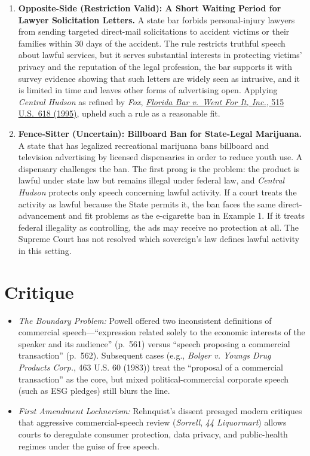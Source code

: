 \documentclass[12pt]{article}
\begin{document}
\begin{enumerate}
\item \textbf{Opposite-Side (Restriction Valid): A Short Waiting Period for Lawyer Solicitation Letters.} A state bar forbids personal-injury lawyers from sending targeted direct-mail solicitations to accident victims or their families within 30 days of the accident. The rule restricts truthful speech about lawful services, but it serves substantial interests in protecting victims' privacy and the reputation of the legal profession, the bar supports it with survey evidence showing that such letters are widely seen as intrusive, and it is limited in time and leaves other forms of advertising open. Applying \textit{Central Hudson} as refined by \textit{Fox}, \href{https://supreme.justia.com/cases/federal/us/515/618/}{\textit{Florida Bar v.\ Went For It, Inc.}, 515 U.S.\ 618 (1995)}, upheld such a rule as a reasonable fit.

\item \textbf{Fence-Sitter (Uncertain): Billboard Ban for State-Legal Marijuana.} A state that has legalized recreational marijuana bans billboard and television advertising by licensed dispensaries in order to reduce youth use. A dispensary challenges the ban. The first prong is the problem: the product is lawful under state law but remains illegal under federal law, and \textit{Central Hudson} protects only speech concerning lawful activity. If a court treats the activity as lawful because the State permits it, the ban faces the same direct-advancement and fit problems as the e-cigarette ban in Example 1. If it treats federal illegality as controlling, the ads may receive no protection at all. The Supreme Court has not resolved which sovereign's law defines lawful activity in this setting.

\end{enumerate}

\section{Critique}
\begin{itemize}
  \item \textit{The Boundary Problem:} Powell offered two inconsistent definitions of commercial speech---``expression related solely to the economic interests of the speaker and its audience'' (p.~561) versus ``speech proposing a commercial transaction'' (p.~562). Subsequent cases (e.g., \textit{Bolger v. Youngs Drug Products Corp.}, 463 U.S. 60 (1983)) treat the ``proposal of a commercial transaction'' as the core, but mixed political-commercial corporate speech (such as ESG pledges) still blurs the line.
  \item \textit{First Amendment Lochnerism:} Rehnquist's dissent presaged modern critiques that aggressive commercial-speech review (\textit{Sorrell}, \textit{44 Liquormart}) allows courts to deregulate consumer protection, data privacy, and public-health regimes under the guise of free speech.
\end{itemize}
\end{document}
